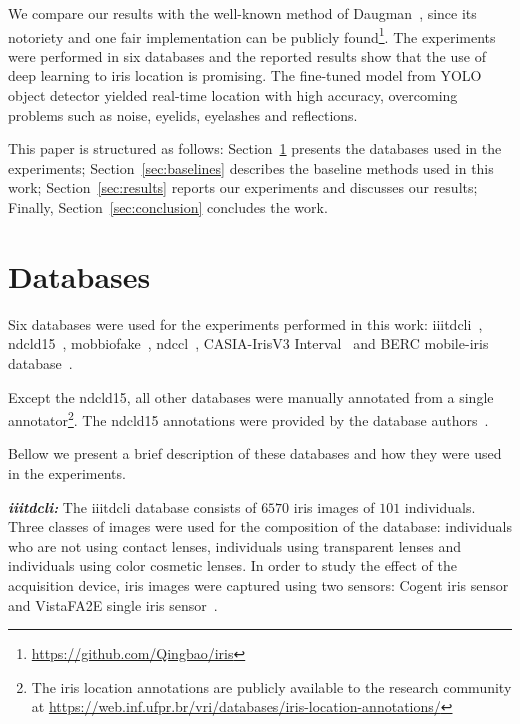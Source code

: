 \documentclass[conference]{IEEEtran}
\begin{document}
We compare our results with the well-known method of Daugman~\cite{daugman1993high}, since its notoriety and one fair implementation can be publicly found\footnote{\url{https://github.com/Qingbao/iris}}.
The experiments were performed in six databases and the reported results show that the use of deep learning to iris location is promising. 
The fine-tuned model from YOLO object detector yielded real-time location with high accuracy, overcoming problems such as noise, eyelids, eyelashes and reflections.

This paper is structured as follows: 
Section~\ref{sec:datasets} presents the databases used in the experiments;
Section~\ref{sec:baselines} describes the baseline methods used in this work;
Section~\ref{sec:results} reports our experiments and discusses our results;
Finally, Section~\ref{sec:conclusion} concludes the work. 


\section{Databases}
\label{sec:datasets}

Six databases were used for the experiments performed in this work: \gls*{iiitdcli}~\cite{kohli2013revisiting}, \gls*{ndcld15}~\cite{doyle2015robust}, \acrshort*{mobbiofake}~\cite{sequeira2014iris}, \gls*{ndccl}~\cite{doyle2014notre}, CASIA-IrisV3 Interval~\cite{interval} and BERC mobile-iris database~\cite{kim2016empirical}. 

Except the \gls*{ndcld15}, all other databases were manually annotated from a single annotator\footnote{The iris location annotations are publicly available to the research community at \url{https://web.inf.ufpr.br/vri/databases/iris-location-annotations/}}.
The \gls*{ndcld15} annotations were provided by the database authors~\cite{doyle2015robust}.

Bellow we present a brief description of these databases and how they were used in the experiments.

\textit{\textbf{\acrlong*{iiitdcli}:}} The \gls*{iiitdcli} database consists of $6570$ iris images of $101$ individuals.
Three classes of images were used for the composition of the database: individuals who are not using contact lenses, individuals using transparent lenses and individuals using color cosmetic lenses. In order to study the effect of the acquisition device, iris images were captured using two sensors: Cogent iris sensor and VistaFA2E single iris sensor~\cite{kohli2013revisiting}. 
\end{document}
